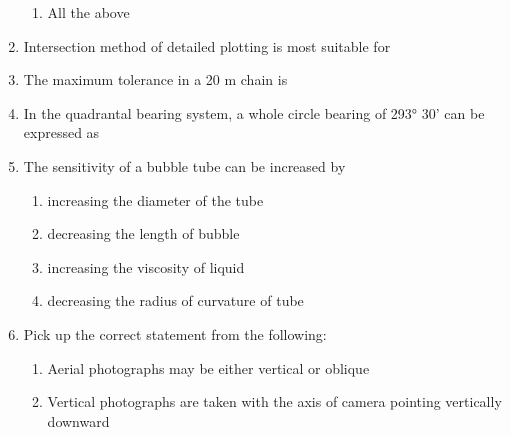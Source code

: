 \documentclass[11pt,a4paper]{article}
\begin{document}
\begin{enumerate}
\begin{enumerate}[label=\Alph*.]
\item{All the above}
\end{enumerate}
\item{Intersection method of detailed plotting is most suitable for}
\\
\item{The maximum tolerance in a 20 m chain is}
\\\begin{enumerate*}[itemjoin=\qquad, label=\Alph*.]
\item{$\pm$2 mm}
\item{$\pm$3 mm}
\item{$\pm$5 mm}
\item{$\pm$8 mm}
\end{enumerate*}
\item{In the quadrantal bearing system, a whole circle bearing of 293° 30' can be expressed as
}
\item{The sensitivity of a bubble tube can be increased by}
\begin{enumerate}[label=\Alph*.]
\item{increasing the diameter of the tube}
\item{decreasing the length of bubble}
\item{increasing the viscosity of liquid}
\item{decreasing the radius of curvature of tube}
\end{enumerate}
\item{Pick up the correct statement from the following:}
\begin{enumerate}[label=\Alph*.]
\item{Aerial photographs may be either vertical or oblique}
\item{Vertical photographs are taken with the axis of camera pointing vertically downward}

\end{enumerate}
\end{enumerate}
\end{document}
